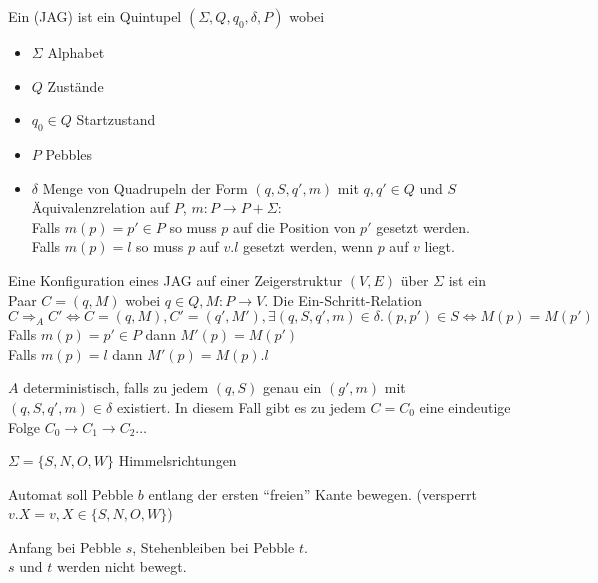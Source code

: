 \begin{definition}

    Ein  (JAG) ist ein Quintupel $(\Sigma, Q, q_0, \delta, P)$ wobei
    \begin{itemize}
        \item $\Sigma$ Alphabet
        \item $Q$ Zustände
        \item $q_0 \in Q$ Startzustand
        \item $P$ Pebbles
        \item $\delta$ Menge von Quadrupeln der Form $(q, S, q', m)$
                mit $q, q' \in Q$
                und $S$ Äquivalenzrelation auf $P$, $m: P \rightarrow P + \Sigma$:
                \\
                Falls $m(p) = p' \in P$ so muss $p$ auf die Position von $p'$ gesetzt werden.
                \\
                Falls $m(p) = l$ so muss $p$ auf $v.l$ gesetzt werden, wenn $p$ auf $v$ liegt.
    \end{itemize}

    Eine Konfiguration eines JAG auf einer Zeigerstruktur $(V, E)$ über $\Sigma$ ist ein Paar $C = (q, M)$ wobei $q \in Q, M: P \rightarrow V$.
    Die Ein-Schritt-Relation $C \Rightarrow_A C' \Longleftrightarrow   C = (q, M), C' = (q', M'), \exists (q, S, q', m) \in \delta .
    (p, p') \in S \Leftrightarrow M(p) = M(p')
    $
    Falls $m(p) = p' \in P$ dann $M'(p) = M(p')$\\
    Falls $m(p) = l$ dann $M'(p) = M(p).l$

    $A$ deterministisch, falls zu jedem $(q, S)$ genau ein $(g', m)$ mit $(q, S, q', m) \in \delta$ existiert. In diesem Fall gibt es zu jedem $C = C_0$ eine eindeutige Folge $C_0 \rightarrow C_1 \rightarrow C_2 \dots$

\end{definition}


\begin{beispiel}

    $\Sigma = \{ S, N, O, W \}$ Himmelsrichtungen

    Automat soll Pebble $b$ entlang der ersten ``freien'' Kante bewegen.
    (versperrt $v.X = v, X \in \{ S, N, O, W \}$)

    Anfang bei Pebble $s$, Stehenbleiben bei Pebble $t$.
    \\
    $s$ und $t$ werden nicht bewegt.

\end{beispiel}



